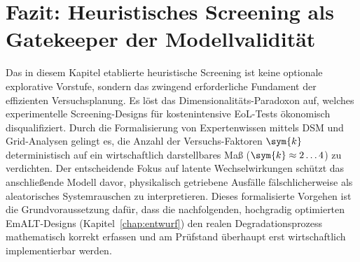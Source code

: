 \section{Fazit: Heuristisches Screening als Gatekeeper der Modellvalidität} \label{sec:screening_fazit}
Das in diesem Kapitel etablierte heuristische Screening ist keine optionale explorative Vorstufe, sondern das zwingend erforderliche Fundament der effizienten Versuchsplanung.
Es löst das Dimensionalitäts-Paradoxon auf, welches experimentelle Screening-Designs für kostenintensive \ac{EoL}-Tests ökonomisch disqualifiziert.
Durch die Formalisierung von Expertenwissen mittels \ac{DSM} und Grid-Analysen gelingt es, die Anzahl der Versuchs-Faktoren $\sym{k}$ deterministisch auf ein wirtschaftlich darstellbares Maß ($\sym{k} \approx 2 \dots 4$) zu verdichten.
Der entscheidende Fokus auf latente Wechselwirkungen schützt das anschließende Modell davor, physikalisch getriebene Ausfälle fälschlicherweise als aleatorisches Systemrauschen zu interpretieren.
Dieses formalisierte Vorgehen ist die Grundvoraussetzung dafür, dass die nachfolgenden, hochgradig optimierten \ac{EmALT}-Designs (Kapitel~\ref{chap:entwurf}) den realen Degradationsprozess mathematisch korrekt erfassen und am Prüfstand überhaupt erst wirtschaftlich implementierbar werden.